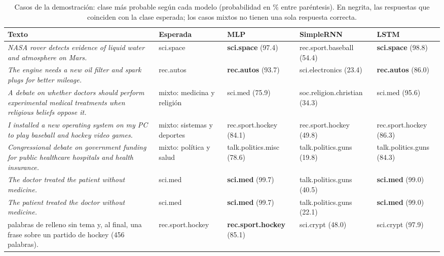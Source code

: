 \documentclass[12pt, a4paper]{article}
\begin{document}
\begin{table}[H]
\centering
\caption{Casos de la demostración: clase más probable según cada modelo (probabilidad en \% entre paréntesis). En negrita, las respuestas que coinciden con la clase esperada; los casos mixtos no tienen una sola respuesta correcta.}
\label{tab:demo}
\scriptsize
\begin{tabularx}{\linewidth}{>{\raggedright\arraybackslash}X >{\raggedright\arraybackslash}p{2.15cm} >{\raggedright\arraybackslash}p{2.65cm} >{\raggedright\arraybackslash}p{2.65cm} >{\raggedright\arraybackslash}p{2.65cm}}
\toprule
\textbf{Texto} & \textbf{Esperada} & \textbf{MLP} & \textbf{SimpleRNN} & \textbf{LSTM} \\
\midrule
\textit{NASA rover detects evidence of liquid water and atmosphere on Mars.} & sci.space & \textbf{sci.space} (97.4) & rec.sport.baseball (54.4) & \textbf{sci.space} (98.8) \\
\textit{The engine needs a new oil filter and spark plugs for better mileage.} & rec.autos & \textbf{rec.autos} (93.7) & sci.electronics (23.4) & \textbf{rec.autos} (86.0) \\
\textit{A debate on whether doctors should perform experimental medical treatments when religious beliefs oppose it.} & mixto: medicina y religión & sci.med (75.9) & soc.religion.christian (34.3) & sci.med (95.6) \\
\textit{I installed a new operating system on my PC to play baseball and hockey video games.} & mixto: sistemas y deportes & rec.sport.hockey (84.1) & rec.sport.hockey (49.8) & rec.sport.hockey (86.3) \\
\textit{Congressional debate on government funding for public healthcare hospitals and health insurance.} & mixto: política y salud & talk.politics.misc (78.6) & talk.politics.guns (19.8) & talk.politics.guns (84.3) \\
\textit{The doctor treated the patient without medicine.} & sci.med & \textbf{sci.med} (99.7) & talk.politics.guns (40.5) & \textbf{sci.med} (99.0) \\
\textit{The patient treated the doctor without medicine.} & sci.med & \textbf{sci.med} (99.7) & talk.politics.guns (22.1) & \textbf{sci.med} (99.0) \\
440 palabras de relleno sin tema y, al final, una frase sobre un partido de hockey (456 palabras). & rec.sport.hockey & \textbf{rec.sport.hockey} (85.1) & sci.crypt (48.0) & sci.crypt (97.9) \\
\bottomrule
\end{tabularx}
\end{table}
\end{document}
